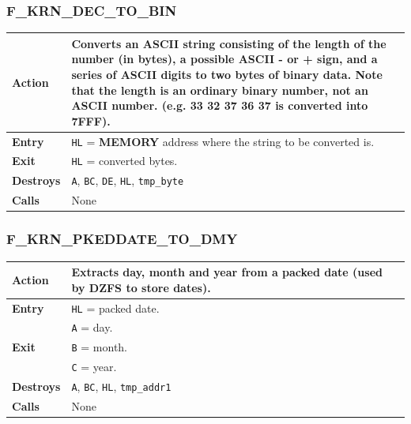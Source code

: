 \documentclass[a4paper,11pt]{article}
\begin{document}
        \subsubsection{F\_KRN\_DEC\_TO\_BIN}
        \label{func:fkrndectobin}
        \begin{tabular}{l p{9cm}}
            \hline\textbf{Action}
            & Converts an ASCII string consisting of the length of the number
            (in bytes), a possible ASCII - or + sign, and a series of ASCII
            digits to two bytes of binary data. Note that the length is an
            ordinary binary number, not an ASCII number. (e.g. 33 32 37 36 37 is
            converted into 7FFF).\\
            \hline\textbf{Entry} & \texttt{HL} = \textbf{MEMORY} address where
            the string to be converted is.\\
            \hline\textbf{Exit} & \texttt{HL} = converted bytes.\\
            \hline\textbf{Destroys} & \texttt{A}, \texttt{BC}, \texttt{DE}, 
            \texttt{HL}, \texttt{tmp\_byte}\\
            \hline\textbf{Calls} & None\\
            \hline
        \end{tabular}

        \subsubsection{F\_KRN\_PKEDDATE\_TO\_DMY}
        \label{func:fkrnpkeddatetodmy}
        \begin{tabular}{l p{9cm}}
            \hline\textbf{Action}
            & Extracts day, month and year from a packed date (used by DZFS to
            store dates).\\
            \hline\textbf{Entry} & \texttt{HL} = packed date.\\
            \hline\multirow[t]{3}{4em}{\textbf{Exit}}
            & \texttt{A} = day.\\
            & \texttt{B} = month.\\
            & \texttt{C} = year.\\
            \hline\textbf{Destroys} & \texttt{A}, \texttt{BC}, \texttt{HL},
            \texttt{tmp\_addr1}\\
            \hline\textbf{Calls} & None\\
            \hline
        \end{tabular}
\end{document}
